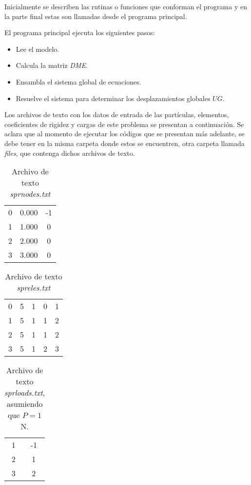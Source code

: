 Inicialmente se describen las rutinas o funciones que conforman el programa y 
en la parte final estas son llamadas desde el programa principal.

El programa principal ejecuta los siguientes pasos:

\begin{itemize}
    \item Lee el modelo.
    \item Calcula la matriz  \textit{DME}.
    \item Ensambla el sistema global de ecuaciones.
    \item Resuelve el sistema para determinar los desplazamientos globales $UG$.
\end{itemize}

Los archivos de texto con los datos de entrada de las partículas, elementos, 
coeficientes de rigidez y cargas de este problema se presentan a continuación. 
Se aclara que al momento de ejecutar los códigos que se presentan más adelante, 
se debe tener en la misma carpeta donde estos se encuentren, otra carpeta 
llamada \textit{files}, que contenga dichos archivos de texto.

\begin{table}[H]
    \begin{tabular}{ccc}
        0 & 0.000 & -1 \\
        1 & 1.000 & 0  \\
        2 & 2.000 & 0  \\
        3 & 3.000 & 0 
    \end{tabular}
    \caption{Archivo de texto \textit{sprnodes.txt}}
\end{table}

\begin{table}[H]
    \begin{tabular}{cccll}
        0 & 5 & 1 & 0 & 1 \\
        1 & 5 & 1 & 1 & 2 \\
        2 & 5 & 1 & 1 & 2 \\
        3 & 5 & 1 & 2 & 3
    \end{tabular}
    \caption{Archivo de texto \textit{spreles.txt}}
\end{table}


\begin{table}[H]
    \begin{tabular}{cc}
        1 & -1 \\
        2 & 1  \\
        3 & 2 
    \end{tabular}
    \caption{Archivo de texto \textit{sprloads.txt}, asumiendo que $P = 1$N.}
\end{table}

